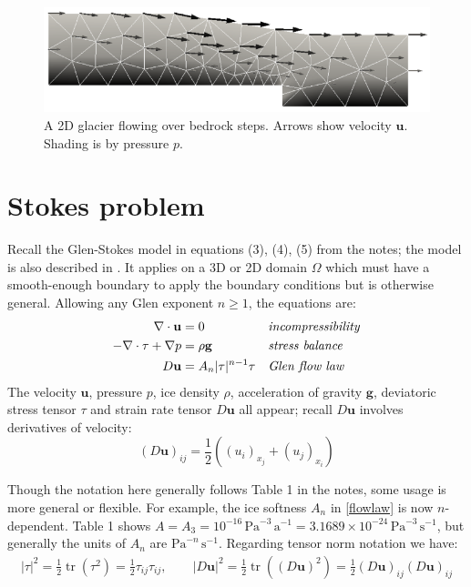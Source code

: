 \documentclass[letterpaper,final,12pt,reqno]{amsart}
\newcommand{\trace}{\operatorname{tr}}
\newcommand{\bg}{\mathbf{g}}
\newcommand{\bu}{\mathbf{u}}
\begin{document}
\begin{figure}[h]
\includegraphics[width=\textwidth,angle=-5.7296]{stepflowlin}  %
\caption{A 2D glacier flowing over bedrock steps.  Arrows show velocity $\bu$.  Shading is by pressure $p$.}
\label{fig:stepflowlin}
\end{figure}


\section{Stokes problem}

Recall the Glen-Stokes model in equations (3), (4), (5) from the notes; the model is also described in \cite{GreveBlatter2009,JouvetRappaz2011}.  It applies on a 3D or 2D domain $\Omega$ which must have a smooth-enough boundary to apply the boundary conditions but is otherwise general.  Allowing any Glen exponent $n\ge 1$, the equations are:
\begin{align}
\nabla \cdot \bu &= 0 &&\text{\emph{incompressibility}} \label{incompressible} \\
- \nabla \cdot \tau + \nabla p &= \rho \bg &&\text{\emph{stress balance}} \label{forcebalance} \\
D\bu &= A_n |\tau|^{n-1} \tau &&\text{\emph{Glen flow law}} \label{flowlaw}
\end{align}
The velocity $\bu$, pressure $p$, ice density $\rho$, acceleration of gravity $\bg$, deviatoric stress tensor $\tau$ and strain rate tensor $D\bu$ all appear; recall $D\bu$ involves derivatives of velocity:
\begin{equation}
(D\bu)_{ij} = \frac{1}{2} \left((u_i)_{x_j} + (u_j)_{x_i}\right) \label{strainrate}
\end{equation}

Though the notation here generally follows Table 1 in the notes, some usage is more general or flexible.  For example, the ice softness $A_n$ in \eqref{flowlaw} is now $n$-dependent.  Table 1 shows $A = A_3 = 10^{-16} \,\text{Pa}^{-3}\,\text{a}^{-1} = 3.1689 \times 10^{-24} \,\text{Pa}^{-3}\,\text{s}^{-1}$, but generally the units of $A_n$ are $\text{Pa}^{-n}\,\text{s}^{-1}$.  Regarding tensor norm notation we have:
\begin{align*}
|\tau|^2 = \frac{1}{2} \trace\left(\tau^2\right) = \frac{1}{2} \tau_{ij} \tau_{ij}, \qquad |D\bu|^2 = \frac{1}{2} \trace\left((D\bu)^2\right) = \frac{1}{2} (D\bu)_{ij} (D\bu)_{ij}
\end{align*}
\end{document}
